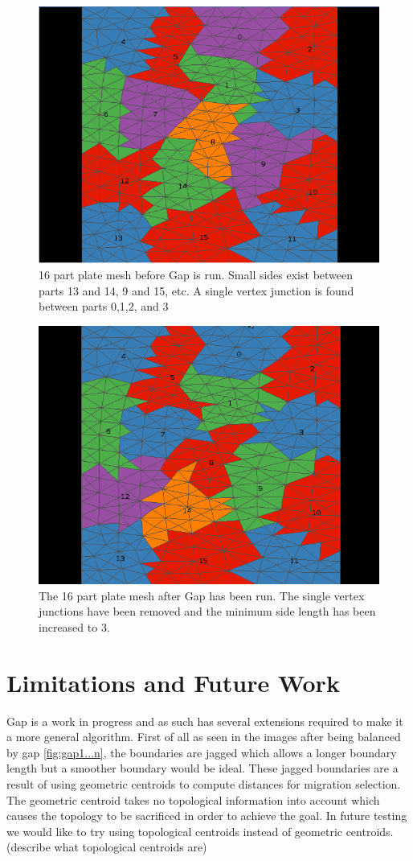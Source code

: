 \documentclass{thesis}
\begin{document}
\begin{figure} [!hb]
\centering
\captionsetup{justification=centering,margin=1cm}
\includegraphics[width=.6\textwidth]{results_before.png}
\caption{\label{fig:plate} \textnormal{16 part plate mesh before Gap is run. Small sides exist between parts 13 and 14, 9 and 15, etc. A single vertex junction is found between parts 0,1,2, and 3}}
\end{figure}

\begin{figure} [!ht]
\centering
\captionsetup{justification=centering,margin=1cm}
\includegraphics[width=.6\textwidth]{results_after.png}
\caption{\label{fig:plate_gap} \textnormal{The 16 part plate mesh after Gap has been run. The single vertex junctions have been removed and the minimum side length has been increased to 3.}}
\end{figure}



\chapter{Limitations and Future Work} 


Gap is a work in progress and as such has several extensions required to make 
it a more general algorithm. First of all as seen in the images after being 
balanced by gap \ref{fig:gap1...n},  the boundaries are jagged which allows a 
longer boundary length but a smoother boundary would be ideal. These jagged 
boundaries are a result of using geometric centroids to compute distances for 
migration selection. The geometric centroid takes no topological information 
into account which causes the topology to be sacrificed in order to achieve the 
goal. In future testing we would like to try using topological centroids 
instead of geometric centroids. (describe what topological centroids are)
\end{document}
